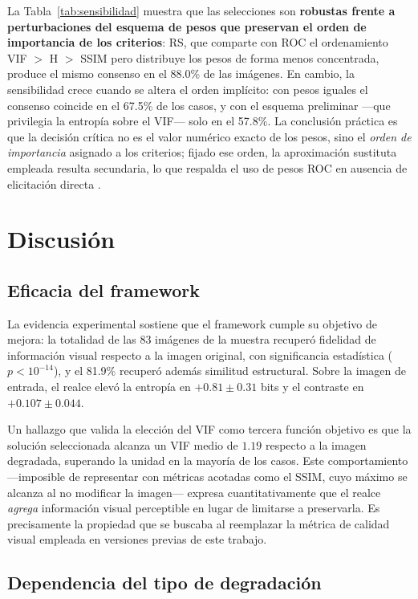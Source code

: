 La Tabla~\ref{tab:sensibilidad} muestra que las selecciones son \textbf{robustas frente a perturbaciones del esquema de pesos que preservan el orden de importancia de los criterios}: RS, que comparte con ROC el ordenamiento VIF $>$ H $>$ SSIM pero distribuye los pesos de forma menos concentrada, produce el mismo consenso en el 88.0\% de las imágenes. En cambio, la sensibilidad crece cuando se altera el orden implícito: con pesos iguales el consenso coincide en el 67.5\% de los casos, y con el esquema preliminar ---que privilegia la entropía sobre el VIF--- solo en el 57.8\%. La conclusión práctica es que la decisión crítica no es el valor numérico exacto de los pesos, sino el \textit{orden de importancia} asignado a los criterios; fijado ese orden, la aproximación sustituta empleada resulta secundaria, lo que respalda el uso de pesos ROC en ausencia de elicitación directa \citep{Roberts2002}.

\section{Discusión}

\subsection{Eficacia del framework}

La evidencia experimental sostiene que el framework cumple su objetivo de mejora: la totalidad de las 83 imágenes de la muestra recuperó fidelidad de información visual respecto a la imagen original, con significancia estadística ($p < 10^{-14}$), y el 81.9\% recuperó además similitud estructural. Sobre la imagen de entrada, el realce elevó la entropía en $+0.81 \pm 0.31$ bits y el contraste en $+0.107 \pm 0.044$.

Un hallazgo que valida la elección del VIF como tercera función objetivo es que la solución seleccionada alcanza un VIF medio de $1.19$ respecto a la imagen degradada, superando la unidad en la mayoría de los casos. Este comportamiento ---imposible de representar con métricas acotadas como el SSIM, cuyo máximo se alcanza al no modificar la imagen--- expresa cuantitativamente que el realce \textit{agrega} información visual perceptible en lugar de limitarse a preservarla. Es precisamente la propiedad que se buscaba al reemplazar la métrica de calidad visual empleada en versiones previas de este trabajo.

\subsection{Dependencia del tipo de degradación}

